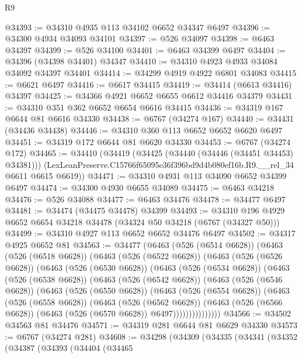 \begin{lexlean}{R9}
\begin{coremodule}
@34393 := @34310 @4935 @113 @34102 @6652 @34347 @6497
@34396 := @34300 @4934 @34093 @34101
@34397 := @526 @34097
@34398 := @6463 @34397
@34399 := @526 @34100
@34401 := @6463 @34399 @6497
@34404 := @34396 (@34398 @34401) @34347
@34410 := @34310 @4923 @4933 @34084 @34092 @34397 @34401
@34414 := @34299 @4919 @4922 @6801 @34083
@34415 := @6621 @6497
@34416 := @6617 @34415
@34419 := @34414 (@6613 @34416) @34397
@34425 := @34366 @4921 @6652 @6655 @6612 @34416 @34379
@34431 := @34310 @351 @362 @6652 @6654 @6616 @34415
@34436 := @34319 @167 @6644 @81 @6616 @34330
@34438 := @6767 (@34274 @167)
@34440 := @34431 (@34436 @34438)
@34446 := @34310 @360 @113 @6652 @6652 @6620 @6497
@34451 := @34319 @172 @6644 @81 @6620 @34330
@34453 := @6767 (@34274 @172)
@34465 := @34410
    (@34419
      (@34425 (@34440 (@34446 (@34451 @34453) @34381)))
      (LexLeanPreserve.C15766f65095e36f396bd9d4b080ef16b.R9.__rel_34 @6611 @6615 @6619))
@34471 := @34310 @4931 @113 @34090 @6652 @34399 @6497
@34474 := @34300 @4930 @6655 @34089
@34475 := @6463 @34218
@34476 := @526 @34088
@34477 := @6463 @34476
@34478 := @34477 @6497
@34481 := @34474 (@34475 @34478) @34399
@34493 := @34310 @196 @4929 @6652 @6654 @34218 @34478 (@34324 @50 @34218 (@6767 (@34327 @50)))
@34499 := @34310 @4927 @113 @6652 @6652 @34476 @6497
@34502 := @34317 @4925 @6652 @81
@34563 := @34477
    (@6463
      (@526 (@6514 @6628))
      (@6463
        (@526 (@6518 @6628))
        (@6463
          (@526 (@6522 @6628))
          (@6463
            (@526 (@6526 @6628))
            (@6463
              (@526 (@6530 @6628))
              (@6463
                (@526 (@6534 @6628))
                (@6463
                  (@526 (@6538 @6628))
                  (@6463
                    (@526 (@6542 @6628))
                    (@6463
                      (@526 (@6546 @6628))
                      (@6463
                        (@526 (@6550 @6628))
                        (@6463
                          (@526 (@6554 @6628))
                          (@6463
                            (@526 (@6558 @6628))
                            (@6463
                              (@526 (@6562 @6628))
                              (@6463
                                (@526 (@6566 @6628))
                                (@6463 (@526 (@6570 @6628)) @6497)))))))))))))))
@34566 := @34502 @34563 @81 @34476
@34571 := @34319 @281 @6644 @81 @6629 @34330
@34573 := @6767 (@34274 @281)
@34608 := @34298
    (@34309
      (@34335
        (@34341
          (@34352
            (@34387
              (@34393
                (@34404
                  (@34465

\end{coremodule}
\end{lexlean}
